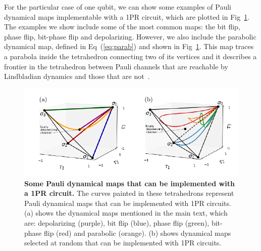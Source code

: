 \documentclass[10pt,letterpaper]{article} %
\newcommand{\fref}[1]{Fig~\ref{#1}}
\newcommand{\eref}[1]{Eq~(\ref{#1})}
\begin{document}
For the particular case of one qubit, we can show some examples of Pauli
dynamical maps implementable with a 1PR circuit, which are plotted in
\fref{Fig5}. 
The examples we show include some of the most common maps: the bit flip, phase flip, bit-phase flip and depolarizing.
However, we also include the parabolic dynamical map,
defined in \eref{eq:parab} and shown in \fref{Fig5}.
This map traces a parabola inside the tetrahedron connecting two of its vertices
and it describes a frontier in the tetrahedron between Pauli channels
that are reachable by Lindbladian dynamics and those that are not~\cite{Davalos}.

\begin{figure} %
\centering
\includegraphics{fig-curves.pdf}
\caption{{\bf Some Pauli dynamical maps that can be implemented with a 1PR circuit.}
The curves painted in these tetrahedrons
represent Pauli dynamical maps that can be implemented with 1PR circuits.
(a) shows the dynamical maps mentioned in the main 
text, which are: depolarizing (purple), bit flip (blue),
phase flip (green), bit-phase flip (red)
and parabolic (orange).
(b) shows dynamical maps selected at random that can be implemented with 1PR 
circuits.}
\label{Fig5}
\end{figure} %
\end{document}
